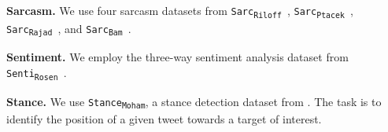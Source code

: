 \noindent     \textbf{Sarcasm.} %
We use four sarcasm datasets from \texttt{Sarc\textsubscript{Riloff}}~\cite{riloff2013sarcasm}, \texttt{Sarc\textsubscript{Ptacek}}~\cite{ptavcek2014sarcasm}, \texttt{Sarc\textsubscript{Rajad}}~\cite{rajadesingan2015sarcasm}, and \texttt{Sarc\textsubscript{Bam}}~\cite{bamman2015contextualized}. 
 
\noindent\textbf{Sentiment.} We employ the three-way sentiment analysis dataset from \texttt{Senti\textsubscript{Rosen}}~\cite{rosenthal-2017-semeval}. 

\noindent\textbf{Stance.} We use \texttt{Stance\textsubscript{Moham}}, a stance detection dataset from \citet{mohammad-2016-semeval}. The task is to identify the position of a given tweet towards a target of interest. 

